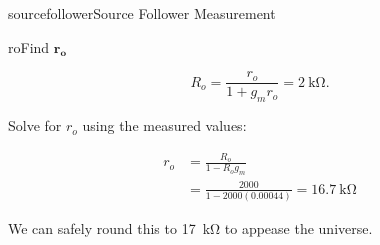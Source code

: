 \begin{mainquestion}{sourcefollower}{Source Follower Measurement}
\begin{partquestion}{ro}{Find $\mathbf{r}_{\mathbf{o}}$}
\begin{answer}
\[
R_{o} = \frac{r_{o}}{1 + g_{m} r_{o}} = \qty{2}{\kilo\ohm}.
\]

Solve for $r_{o}$ using the measured values:

\begin{align*}
    r_o &= \frac{R_o}{1 - R_o g_m} \\
    &= \frac{2000}{1 - 2000(0.00044)} = \qty{16.7}{\kilo\ohm}
\end{align*}

We can safely round this to \qty{17}{\kilo\ohm} to appease the universe. 

\end{answer}
\end{partquestion}

\end{mainquestion}
